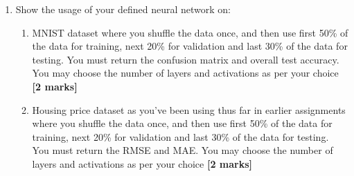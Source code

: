 \documentclass[colorlinks,linkcolor=true]{article}
\begin{document}
\begin{enumerate}
\begin{enumerate}
\begin{enumerate}
\end{enumerate}

\item Show the usage of your defined neural network on:
\begin{enumerate}
	\item MNIST dataset where you shuffle the data once, and then use first 50\% of the data for training, next 20\% for validation and last 30\% of the data for testing. You must return the confusion matrix and overall test accuracy. You may choose the number of layers and activations as per your choice \textbf{[2 marks]}
	\item Housing price dataset as you've been using thus far in earlier assignments where you shuffle the data once, and then use first 50\% of the data for training, next 20\% for validation and last 30\% of the data for testing. You must return the RMSE and MAE. You may choose the number of layers and activations as per your choice \textbf{[2 marks]}
\end{enumerate}
\end{enumerate}
\end{enumerate}



	
\end{document}
